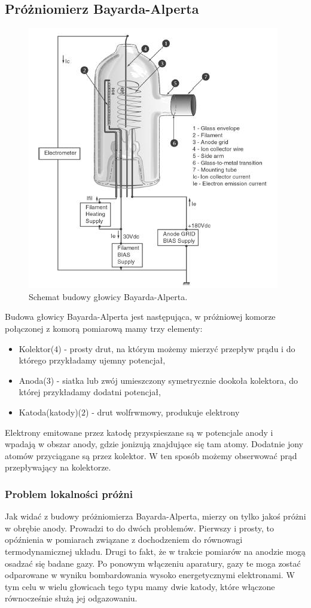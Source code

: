 \documentclass[paper=a4, fontsize=12pt]{scrartcl}
\begin{document}
\subsection{Próżniomierz Bayarda-Alperta}\begin{figure}[h!]
	\centering
	\includegraphics[width=0.4\linewidth]{BayardAlp}
	\caption{Schemat budowy głowicy Bayarda-Alperta.}
	\label{fig:BayardAlp}
\end{figure}
Budowa głowicy Bayarda-Alperta jest następująca, w próżniowej komorze połączonej z komorą pomiarową mamy trzy elementy:
\begin{itemize}
	\item Kolektor($4$) - prosty drut, na którym możemy mierzyć przepływ prądu i do którego przykładamy ujemny potencjał,
	\item Anoda($3$) - siatka lub zwój umieszczony symetrycznie dookoła kolektora, do której przykładamy dodatni potencjał,
	\item Katoda(katody)($2$) - drut wolfrwmowy, produkuje elektrony
\end{itemize}
Elektrony emitowane przez katodę przyspieszane są w potencjale anody i wpadają w obszar anody, gdzie jonizują znajdujące się tam atomy. Dodatnie jony atomów przyciągane są przez kolektor. W ten sposób możemy obserwować prąd przepływający na kolektorze.
\subsubsection{Problem lokalności próżni}
Jak widać z budowy próżniomierza Bayarda-Alperta, mierzy on tylko jakoś próżni w obrębie anody. Prowadzi to do dwóch problemów. Pierwszy i prosty, to opóźnienia w pomiarach związane z dochodzeniem do równowagi termodynamicznej układu. Drugi to fakt, że w trakcie pomiarów na anodzie mogą osadzać się badane gazy. Po ponowym włączeniu aparatury, gazy te moga zostać odparowane w wyniku bombardowania wysoko energetycznymi elektronami. W tym celu w wielu głowicach tego typu mamy dwie katody, które włączone równocześnie służą jej odgazowaniu.
\end{document}
